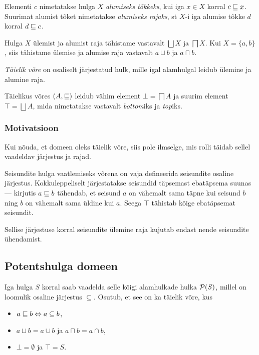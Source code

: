 \documentclass[../thesis.tex]{subfiles}
\begin{document}
\begin{definition}
Elementi $c$ nimetatakse hulga $X$ \emph{alumiseks tõkkeks}, kui iga $x \in X$ korral $c \sqsubseteq x$. Suurimat alumist tõket nimetatakse \emph{alumiseks rajaks}, st $X$-i iga alumise tõkke $d$ korral $d \sqsubseteq c$.
\end{definition}

Hulga $X$ ülemist ja alumist raja tähistame vastavalt $\bigsqcup X$ ja $\bigsqcap X$. Kui $X = \{a, b\}$, siis tähistame ülemise ja alumise raja vastavalt $a \sqcup b$ ja $a \sqcap b$.

\begin{definition}
\emph{Täielik võre} on osaliselt järjestatud hulk, mille igal alamhulgal leidub ülemine ja alumine raja.
\end{definition}

Täielikus võres $(A, \sqsubseteq)$ leidub vähim element $\bot = \bigsqcap A$ ja suurim element $\top = \bigsqcup A$, mida nimetatakse vastavalt \textit{bottom}iks ja \textit{top}iks.

\subsubsection{Motivatsioon}
Kui nõuda, et domeen oleks täielik võre, siis pole ilmselge, mis rolli täidab sellel vaadeldav järjestus ja rajad.

Seisundite hulga vaatlemiseks võrena on vaja defineerida seisundite osaline järjestus. Kokkuleppeliselt järjestatakse seisundid täpsemast ebatäpsema suunas --- kirjutis $a \sqsubseteq b$ tähendab, et seisund $a$ on vähemalt sama täpne kui seisund $b$ ning $b$ on vähemalt sama üldine kui $a$. Seega $\top$ tähistab kõige ebatäpsemat seisundit.

Sellise järjestuse korral seisundite ülemine raja kujutab endast nende seisundite ühendamist.


\subsection{Potentshulga domeen}

Iga hulga $S$ korral saab vaadelda selle kõigi alamhulkade hulka $\mathcal{P}(S)$, millel on loomulik osaline järjestus $\subseteq$.
Osutub, et see on ka täielik võre, kus
\begin{itemize}[nosep]
	\item $a \sqsubseteq b \Leftrightarrow a \subseteq b$,
	\item $a \sqcup b = a \cup b$ ja $a \sqcap b = a \cap b$,
	\item $\bot = \emptyset$ ja $\top = S$.
\end{itemize}
\end{document}
